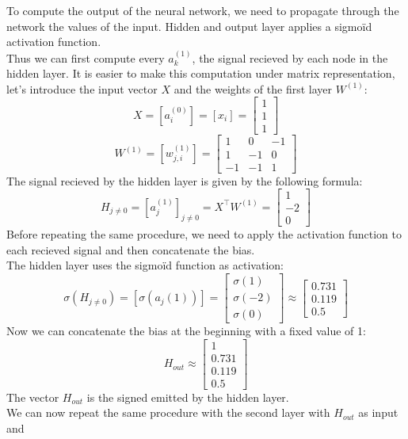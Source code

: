 \documentclass[a4paper, 10pt]{article}
\begin{document}
To compute the output of the neural network, we need to propagate
through the network the values of the input. Hidden and output layer applies a sigmoïd activation function.
\\
Thus we can first compute every $a_k^{(1)}$, the signal recieved by each node in the hidden layer.
It is easier to make this computation under matrix representation, let's introduce the input vector $X$ and
the weights of the first layer $W^{(1)}$:
$$
X = [a_i^{(0)}] = [x_i] =\begin{bmatrix}
    1\\
    1\\
    1
\end{bmatrix}
$$
$$
W^{(1)} = [w_{j,i}^{(1)}] =  \begin{bmatrix}
    1 & 0 & -1\\
    1 & -1 & 0\\
    -1 & -1 & 1
\end{bmatrix}
$$
The signal recieved by the hidden layer is given by the following formula:
$$
H_{j\ne0} = [a_j^{(1)}]_{j\ne0} = X^\top W^{(1)} = \begin{bmatrix}
    1\\
    -2\\
    0
\end{bmatrix}
$$
Before repeating the same procedure, we need to apply the activation function
to each recieved signal and then concatenate the bias.
\\
The hidden layer uses the sigmoïd function as activation:
$$
\sigma(H_{j\ne0}) = [\sigma(a_j{(1)})] = \begin{bmatrix}
    \sigma(1)\\
    \sigma(-2)\\
    \sigma(0)
\end{bmatrix}
\approx \begin{bmatrix}
        0.731\\
        0.119\\
        0.5
\end{bmatrix}
$$
Now we can concatenate the bias at the beginning with a fixed value of 1:
$$
H_{out} \approx \begin{bmatrix}
    1\\
    0.731\\
    0.119\\
    0.5
\end{bmatrix}
$$
The vector $H_{out}$ is the signed emitted by the hidden layer.
\\
We can now repeat the same procedure with the second layer with $H_{out}$ as input and 
\end{document}
